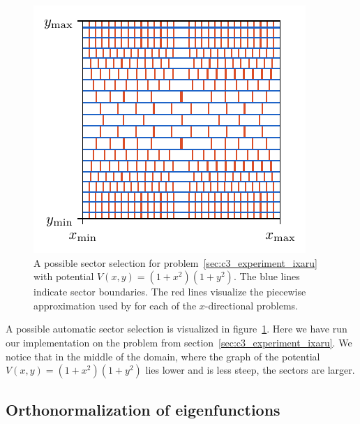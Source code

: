 \begin{figure}
  \begin{center}
    \begin{minipage}[b]{.59\textwidth}
      \includegraphics[width=\textwidth]{img/chapter3/sector_example.pdf}
    \end{minipage}
    \hfill
    \begin{minipage}[b]{.4\textwidth}
      \caption{A possible sector selection for problem~\ref{sec:c3_experiment_ixaru} with potential $V(x, y) = (1+x^2)(1+y^2)$. The blue lines indicate sector boundaries. The red lines visualize the piecewise approximation used by  for each of the $x$-directional problems.}\label{fig:c3_sector_selection_example}
    \end{minipage}
  \end{center}
\end{figure}

A possible automatic sector selection is visualized in figure~\ref{fig:c3_sector_selection_example}. Here we have run our implementation on the problem from section~\eqref{sec:c3_experiment_ixaru}. We notice that in the middle of the domain, where the graph of the potential $V(x, y) = (1+x^2)(1+y^2)$ lies lower and is less steep, the sectors are larger.

\subsection{Orthonormalization of eigenfunctions}\label{sec:c3_improvement_orthonormalization}

